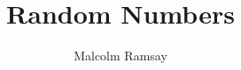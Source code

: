 \documentclass[aspectratio=169,14pt]{beamer}
\author{Malcolm Ramsay}
\title{Random Numbers}
\begin{document}
\begin{frame}[t]{}
  \maketitle
\end{frame}


\end{document}

